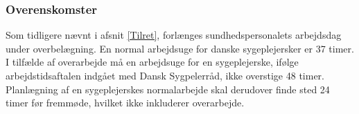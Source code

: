 \subsubsection{Overenskomster}
Som tidligere nævnt i afsnit \ref{Tilret}, forlænges sundhedspersonalets arbejdsdag under overbelægning. En normal arbejdsuge for danske sygeplejersker er 37 timer. I tilfælde af overarbejde må en arbejdsuge for en sygeplejerske, ifølge arbejdstidsaftalen indgået med Dansk Sygpelerråd, ikke overstige 48 timer. Planlægning af en sygeplejerskes normalarbejde skal derudover finde sted 24 timer før fremmøde, hvilket ikke inkluderer overarbejde.\cite{Danske2015}  
 

